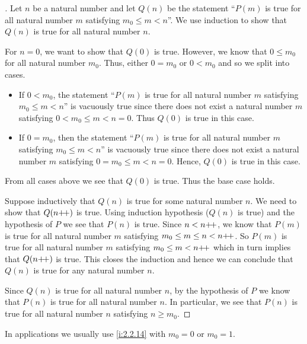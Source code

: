 \begin{proof}[]
  Let \(n\) be a natural number and let \(Q(n)\) be the statement ``\(P(m)\) is true for all natural number \(m\) satisfying \(m_0 \leq m < n\)''.
  We use induction to show that \(Q(n)\) is true for all natural number \(n\).

  For \(n = 0\), we want to show that \(Q(0)\) is true.
  However, we know that \(0 \leq m_0\) for all natural number \(m_0\).
  Thus, either \(0 = m_0\) or \(0 < m_0\) and so we split into cases.
  \begin{itemize}
    \item If \(0 < m_0\), the statement ``\(P(m)\) is true for all natural number \(m\) satisfying \(m_0 \leq m < n\)'' is vacuously true since there does not exist a natural number \(m\) satisfying \(0 < m_0 \leq m < n = 0\).
          Thus \(Q(0)\) is true in this case.
    \item If \(0 = m_0\), then the statement ``\(P(m)\) is true for all natural number \(m\) satisfying \(m_0 \leq m < n\)'' is vacuously true since there does not exist a natural number \(m\) satisfying \(0 = m_0 \leq m < n = 0\).
          Hence, \(Q(0)\) is true in this case.
  \end{itemize}
  From all cases above we see that \(Q(0)\) is true.
  Thus the base case holds.

  Suppose inductively that \(Q(n)\) is true for some natural number \(n\).
  We need to show that \(Q(n{+}\!{+})\) is true.
  Using induction hypothesis (\(Q(n)\) is true) and the hypothesis of \(P\) we see that \(P(n)\) is true.
  Since \(n < n{+}\!{+}\), we know that \(P(m)\) is true for all natural number \(m\) satisfying \(m_0 \leq m \leq n < n{+}\!{+}\).
  So \(P(m)\) is true for all natural number \(m\) satisfying \(m_0 \leq m < n{+}\!{+}\) which in turn implies that \(Q(n{+}\!{+})\) is true.
  This closes the induction and hence we can conclude that \(Q(n)\) is true for any natural number \(n\).

  Since \(Q(n)\) is true for all natural number \(n\), by the hypothesis of \(P\) we know that \(P(n)\) is true for all natural number \(n\).
  In particular, we see that \(P(n)\) is true for all natural number \(n\) satisfying \(n \geq m_0\).
\end{proof}

\begin{rmk}\label{i:2.2.15}
  In applications we usually use \cref{i:2.2.14} with \(m_0 = 0\) or \(m_0 = 1\).
\end{rmk}

